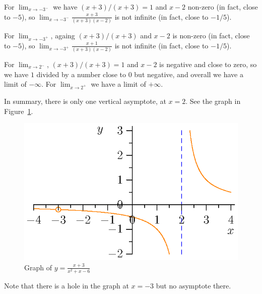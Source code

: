 \documentclass{article}
\newcommand{\ds}{\displaystyle}
\begin{document}
\begin{enumerate}
  For $\ds \lim_{x\to -3^-}$ we have $(x+3)/(x+3)=1$ 
  and $x-2$ non-zero (in fact, close to $-5$),
  so $\ds \lim_{x\to -3^-} \frac{x+3}{(x+3)(x-2)}$ is not infinite (in 
  fact, close to $-1/5$).

  For $\ds \lim_{x\to -3^+}$, againg $(x+3)/(x+3)$ and 
  $x-2$ is non-zero (in fact, close to $-5$),
  so $\ds \lim_{x\to -3^+} \frac{x+1}{(x+3)(x-2)}$ is not infinite (in 
  fact, close to $-1/5$).

  For $\ds \lim_{x\to 2^-}$, $(x+3)/(x+3)=1$ and
  $x-2$ is negative and close to zero, so we have $1$ divided by a number
  close to $0$ but negative, and overall we have a limit
  of $-\infty$.  For $\ds \lim_{x\to 2^+}$ we have a limit of $+\infty$.

  In summary, there is only one vertical asymptote, at $x=2$.  See the graph
  in Figure~\ref{fig:graph-hole-asymptote}.
  \begin{figure}
    \begin{center}
      \includegraphics{graph-(x+3)div(x+3)(x-2).eps}
    \end{center}
    \caption{Graph of $\ds y=\frac{x+3}{x^2+x-6}$}
    \label{fig:graph-hole-asymptote}
  \end{figure}
  Note that there is a hole in the graph at $x=-3$ but no asymptote there.
\end{enumerate}
\end{document}
